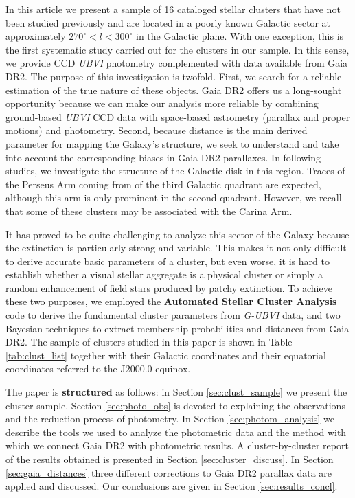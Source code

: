 \documentclass[draft]{aa}
\begin{document}
In this article we present a sample of 16 cataloged stellar clusters
\citep{Dias_2002} that have not been studied previously and are located in a
poorly known Galactic sector at approximately $270^\circ<l<300^\circ$ in the
Galactic plane. With one exception, this is the first systematic study carried
out for the clusters in our sample. In this
sense, we provide CCD \textit{UBVI} photometry complemented with data available
from Gaia DR2. The purpose of this investigation is twofold. First, we search
for a reliable estimation of the true nature of these objects. Gaia DR2 offers
us a long-sought opportunity because we can make our analysis more reliable by
combining  ground-based \textit{UBVI} CCD data with space-based astrometry 
(parallax and proper motions) and photometry. Second, because distance is the
main derived parameter for mapping the Galaxy’s structure, we seek to
understand and take
into account the corresponding biases in Gaia DR2 parallaxes.
In following studies, we investigate the structure of the
Galactic disk in this region. Traces of the Perseus Arm coming from of the
third Galactic quadrant  are expected, although this arm is only
prominent in the second quadrant. However, we recall 
that some of these clusters may be associated with the Carina Arm.

It has proved to be quite challenging to analyze this sector of the Galaxy because the extinction is particularly strong and variable. This
makes it not only difficult to derive accurate basic parameters of a cluster,
but even worse, it is hard to establish whether a visual stellar aggregate is a physical
cluster or simply a random enhancement of field stars produced by patchy
extinction. 
%
To achieve these two purposes, we employed the \textbf{Automated Stellar
Cluster Analysis} code \citep[\texttt{ASteCA};][]{Perren_2015} to derive
the fundamental cluster parameters from \textit{G-UBVI} data, and two Bayesian
techniques to extract membership probabilities and distances from Gaia DR2. The
sample of clusters studied in this paper is shown in Table 
\ref{tab:clust_list} together with their Galactic coordinates and their
equatorial coordinates referred to the J2000.0 equinox.

The paper is \textbf{structured} as follows: in Section \ref{sec:clust_sample} we
present the cluster sample.
Section \ref{sec:photo_obs} is devoted to explaining the observations and the
reduction process of photometry. In Section \ref{sec:photom_analysis} we
describe the tools we used to analyze the photometric data and the method with which we connect
Gaia DR2 with photometric results. A cluster-by-cluster report of the results
obtained is presented in Section \ref{sec:cluster_discuss}. In Section
\ref{sec:gaia_distances} three different corrections to Gaia DR2 parallax
data are applied and discussed. Our conclusions are given in Section 
\ref{sec:results_concl}.
\end{document}
